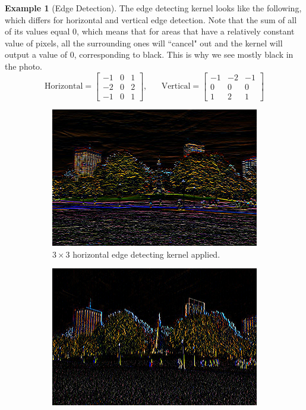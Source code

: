 \documentclass{article}
\theoremstyle{definition}
\newtheorem{example}{Example}[section]
\theoremstyle{remark}
\theoremstyle{definition}
\begin{document}
\begin{example}[Edge Detection]
The edge detecting kernel looks like the following, which differs for horizontal and vertical edge detection. Note that the sum of all of its values equal $0$, which means that for areas that have a relatively constant value of pixels, all the surrounding ones will ``cancel" out and the kernel will output a value of $0$, corresponding to black. This is why we see mostly black in the photo. 
\[\text{Horizontal} = \begin{bmatrix} -1 & 0 & 1 \\ -2 & 0 & 2 \\ -1 & 0 & 1 \end{bmatrix}, \;\;\;\;\;\; \text{Vertical} = \begin{bmatrix} -1 & -2 & -1 \\ 0 & 0 & 0 \\ 1 & 2 & 1 \end{bmatrix}\]
\begin{figure}[hbt!]
    \centering
    \begin{subfigure}[b]{0.45\textwidth}
    \centering
        \includegraphics[width=\textwidth]{Images/OpenCV/Horizontal.png}
        \caption{$3 \times 3$ horizontal edge detecting kernel applied. }
        \label{fig:horizontal_edge}
    \end{subfigure}
    \begin{subfigure}[b]{0.45\textwidth}
    \centering
        \includegraphics[width=\textwidth]{Images/OpenCV/Vertical.png}

\end{subfigure}
\end{figure}
\end{example}
\end{document}
